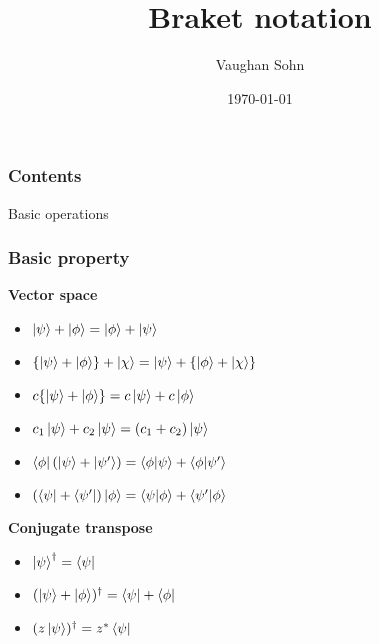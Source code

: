 \documentclass[9pt]{beamer}
\title{Braket notation}
\date{\today}
\author{Vaughan Sohn}
\begin{document}
    \maketitle
    
    \begin{frame}
        \frametitle{Contents}
        \tableofcontents
    \end{frame}

    \begin{section}{Basic operations}
        \begin{frame}
            \frametitle{Basic property}
            \textbf{Vector space}
            \begin{itemize}
                \item $\ket \psi + \ket \phi = \ket \phi + \ket \psi$
                \item $\{\ket \psi + \ket \phi \} + \ket \chi = \ket \psi + \{ \ket \phi  + \ket \chi \}$
                \item $c \{ \ket \psi +  \ket \phi \} = c \ket \psi + c \ket \phi$
                \item $c_1 \ket \psi + c_2 \ket \psi = (c_1 + c_2) \ket \psi$
                \item $\bra \phi ( \ket  \psi + \ket {\psi'}) = \braket{\phi|\psi} + \braket{\phi |\psi'}$
                \item $ (\bra  \psi + \bra {\psi'}) \ket \phi = \braket{\psi|\phi} + \braket{\psi' |\phi}$
            \end{itemize}
            \vspace{0.5cm}
            \textbf{Conjugate transpose}
            \begin{itemize}
                \item $\ket \psi ^\dagger = \bra \psi$
                \item $(\ket \psi + \ket \phi)^\dagger = \bra \psi + \bra \phi$
                \item $(z \ket{\psi})^\dagger = z^\ast \bra{\psi} $
            \end{itemize}
        \end{frame}

    \end{section}
\end{document}
